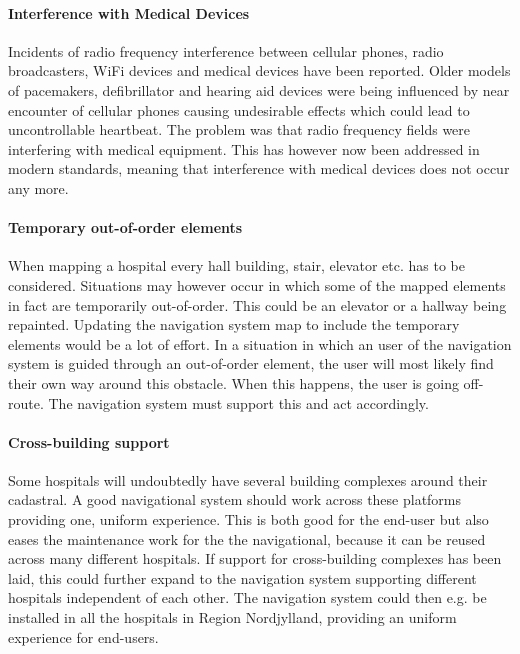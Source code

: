 \paragraph{Interference with Medical Devices}

Incidents of radio frequency interference between cellular phones, radio broadcasters, WiFi devices and medical devices have been reported. Older models of pacemakers, defibrillator and hearing aid devices were being influenced by near encounter of cellular phones causing undesirable effects which could lead to uncontrollable heartbeat. 
The problem was that radio frequency fields were interfering with medical equipment. This has however now been addressed in modern standards, meaning that interference with medical devices does not occur any more. \cite{Man1998,Case}

\paragraph{Temporary out-of-order elements}

When mapping a hospital every hall building, stair, elevator etc. has to be considered. Situations may however occur in which some of the mapped elements in fact are temporarily out-of-order. This could be an elevator or a hallway being repainted. Updating the navigation system map to include the temporary elements would be a lot of effort. In a situation in which an user of the navigation system is guided through an out-of-order element, the user will most likely find their own way around this obstacle. When this happens, the user is going off-route. The navigation system must support this and act accordingly.

\paragraph{Cross-building support}

Some hospitals will undoubtedly have several building complexes around their cadastral. A good navigational system should work across these platforms providing one, uniform experience. This is both good for the end-user but also eases the maintenance work for the the navigational, because it can be reused across many different hospitals. If support for cross-building complexes has been laid, this could further expand to the navigation system supporting different hospitals independent of each other. The navigation system could then e.g. be installed in all the hospitals in Region Nordjylland, providing an uniform experience for end-users.

